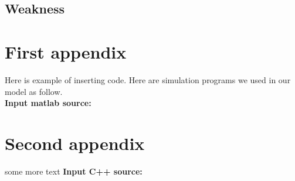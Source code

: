 \documentclass{mcmthesis}
\begin{document}
\subsection{Weakness}



\begin{appendices}

\section{First appendix}

Here is example of inserting code. Here are simulation programs we used in our model as follow.\\

\textbf{\textcolor[rgb]{0.98,0.00,0.00}{Input matlab source:}}

\section{Second appendix}

some more text \textcolor[rgb]{0.98,0.00,0.00}{\textbf{Input C++ source:}}


\end{appendices}
\end{document}
